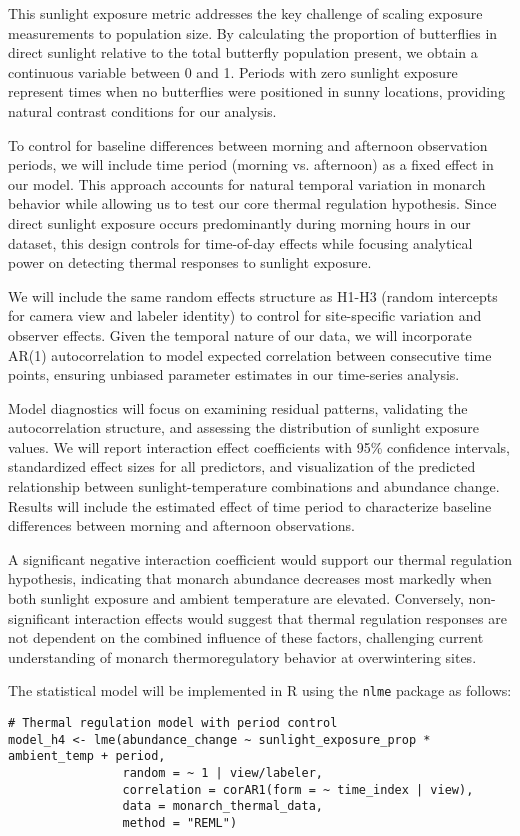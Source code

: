 This sunlight exposure metric addresses the key challenge of scaling exposure measurements to population size. By calculating the proportion of butterflies in direct sunlight relative to the total butterfly population present, we obtain a continuous variable between 0 and 1. Periods with zero sunlight exposure represent times when no butterflies were positioned in sunny locations, providing natural contrast conditions for our analysis.

To control for baseline differences between morning and afternoon observation periods, we will include time period (morning vs. afternoon) as a fixed effect in our model. This approach accounts for natural temporal variation in monarch behavior while allowing us to test our core thermal regulation hypothesis. Since direct sunlight exposure occurs predominantly during morning hours in our dataset, this design controls for time-of-day effects while focusing analytical power on detecting thermal responses to sunlight exposure.

We will include the same random effects structure as H1-H3 (random intercepts for camera view and labeler identity) to control for site-specific variation and observer effects. Given the temporal nature of our data, we will incorporate AR(1) autocorrelation to model expected correlation between consecutive time points, ensuring unbiased parameter estimates in our time-series analysis.

Model diagnostics will focus on examining residual patterns, validating the autocorrelation structure, and assessing the distribution of sunlight exposure values. We will report interaction effect coefficients with 95\% confidence intervals, standardized effect sizes for all predictors, and visualization of the predicted relationship between sunlight-temperature combinations and abundance change. Results will include the estimated effect of time period to characterize baseline differences between morning and afternoon observations.

A significant negative interaction coefficient would support our thermal regulation hypothesis, indicating that monarch abundance decreases most markedly when both sunlight exposure and ambient temperature are elevated. Conversely, non-significant interaction effects would suggest that thermal regulation responses are not dependent on the combined influence of these factors, challenging current understanding of monarch thermoregulatory behavior at overwintering sites.

The statistical model will be implemented in R using the \texttt{nlme} package as follows:

\begin{verbatim}
# Thermal regulation model with period control
model_h4 <- lme(abundance_change ~ sunlight_exposure_prop * ambient_temp + period,
                random = ~ 1 | view/labeler,
                correlation = corAR1(form = ~ time_index | view),
                data = monarch_thermal_data,
                method = "REML")
\end{verbatim}